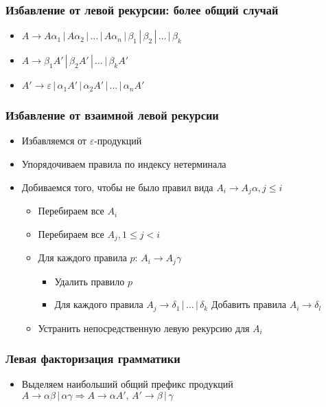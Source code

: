 \documentclass{beamer}
\begin{document}
\begin{frame}[fragile]
  \transwipe[direction=90]
  \frametitle{Избавление от левой рекурсии: более общий случай}
  \begin{itemize}
   \item $A \rightarrow A \alpha_1 \, | \, A \alpha_2 \, | \, \dots \, | \, A \alpha_n \, | \, \beta_1 \, | \, \beta_2 \, | \, \dots \, | \, \beta_k$
  \end{itemize}
  \begin{itemize}
   \item $A \rightarrow \beta_1 A' \, | \, \beta_2 A' \, | \, \dots \, | \, \beta_k A'$
   \item $A' \rightarrow \varepsilon \, | \, \alpha_1 A' \, | \, \alpha_2 A' \, | \, \dots \, | \, \alpha_n A' $
  \end{itemize}
\end{frame}

\begin{frame}[fragile]
  \transwipe[direction=90]
  \frametitle{Избавление от взаимной левой рекурсии}
  \begin{itemize}
   \item Избавляемся от $\varepsilon$-продукций
   \item Упорядочиваем правила по индексу нетерминала
   \item Добиваемся того, чтобы не было правил вида $A_i \rightarrow A_j \alpha, j \leq i$
   \begin{itemize}
     \item Перебираем все $A_i$
     \item Перебираем все $A_j, 1 \leq j < i$
     \item Для каждого правила $p: \, A_i \rightarrow A_j \gamma$
     \begin{itemize}
       \item Удалить правило $p$
       \item Для каждого правила $A_j \rightarrow \delta_1 \,|\, \dots \, | \, \delta_k$ Добавить правила $A_i \rightarrow \delta_l$
     \end{itemize}
     \item Устранить непосредственную левую рекурсию для $A_i$
   \end{itemize}
  \end{itemize}
\end{frame}

 
\begin{frame}[fragile]
  \transwipe[direction=90]
  \frametitle{Левая факторизация грамматики}
  \begin{itemize}
   \item Выделяем наибольший общий префикс продукций $A \rightarrow \alpha \beta \, | \, \alpha \gamma \Rightarrow A\rightarrow \alpha A', \, A' \rightarrow \beta \, | \, \gamma$
  \end{itemize}
\end{frame}
\end{document}
